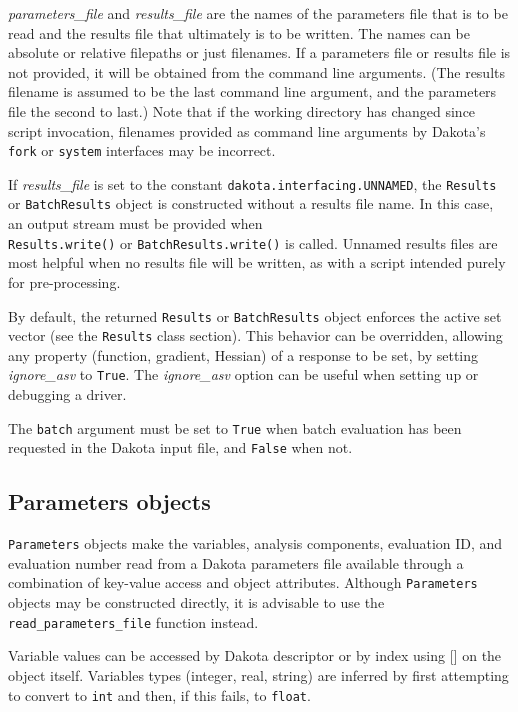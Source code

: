 \emph{parameters\_file} and \emph{results\_file} are the names of the parameters file that is to be read
and the results file that  ultimately is to be written. The names can be  absolute or relative filepaths or
just filenames. If a parameters file or results file is not provided, it will be obtained from the command 
line arguments. (The results filename is assumed to be the last command line argument, and the parameters 
file the second to last.) Note that if the working directory has changed since script invocation, filenames
provided as command line arguments by Dakota's {\tt fork} or {\tt system} interfaces may be incorrect.

If \emph{results\_file} is set to the constant {\tt dakota.interfacing.UNNAMED}, the {\tt Results} or 
{\tt BatchResults} object is constructed without a results file name.  In this case, an output stream must be 
provided when\\{\tt Results.write()} or {\tt BatchResults.write()} is called. Unnamed results files are most 
helpful when no results file will be written, as with a script intended purely for pre-processing.

By default, the returned {\tt Results} or {\tt BatchResults} object enforces the active set vector (see the 
{\tt Results} class section). This behavior can be overridden, allowing any property (function, gradient, Hessian) of 
a response to be set, by setting \emph{ignore\_asv} to {\tt True}. The \emph{ignore\_asv} option can be useful
when setting up or debugging a driver.

The {\tt batch} argument must be set to {\tt True} when batch evaluation has been requested in the Dakota input
file, and {\tt False} when not.

\subsection{Parameters objects}

{\tt Parameters} objects make the variables, analysis components, evaluation ID, and evaluation number read from a Dakota parameters file available through a combination of key-value access and object attributes. Although {\tt Parameters} objects may be constructed directly, it is advisable to use the {\tt read\_parameters\_file} function instead.

Variable values can be accessed by Dakota descriptor or by index using {[}{]} on the object itself. Variables types (integer, real, string) are inferred by first attempting to convert to {\tt int} and then, if this fails, to {\tt float}.

